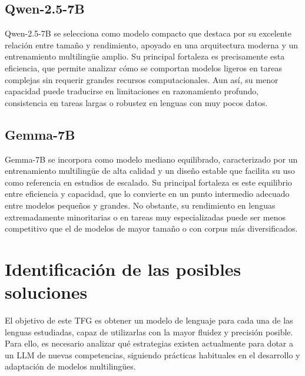 \subsection*{Qwen-2.5-7B}
Qwen-2.5-7B \cite{qwen2.5_2024} se selecciona como modelo compacto que destaca por su excelente relación entre tamaño y rendimiento, apoyado en una arquitectura moderna y un entrenamiento multilingüe amplio. Su principal fortaleza es precisamente esta eficiencia, que permite analizar cómo se comportan modelos ligeros en tareas complejas sin requerir grandes recursos computacionales. Aun así, su menor capacidad puede traducirse en limitaciones en razonamiento profundo, consistencia en tareas largas o robustez en lenguas con muy pocos datos.

\subsection*{Gemma-7B}
Gemma-7B \cite{gemma2024} se incorpora como modelo mediano equilibrado, caracterizado por un entrenamiento multilingüe de alta calidad y un diseño estable que facilita su uso como referencia en estudios de escalado. Su principal fortaleza es este equilibrio entre eficiencia y capacidad, que lo convierte en un punto intermedio adecuado entre modelos pequeños y grandes. No obstante, su rendimiento en lenguas extremadamente minoritarias o en tareas muy especializadas puede ser menos competitivo que el de modelos de mayor tamaño o con corpus más diversificados.


\section{Identificación de las posibles soluciones}
El objetivo de este TFG es obtener un modelo de lenguaje para cada una de las lenguas estudiadas, capaz de utilizarlas con la mayor fluidez y precisión posible. Para ello, es necesario analizar qué estrategias existen actualmente para dotar a un LLM de nuevas competencias, siguiendo prácticas habituales en el desarrollo y adaptación de modelos multilingües. 


